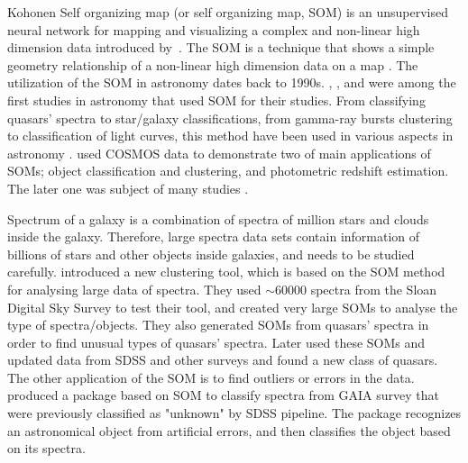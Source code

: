 \documentclass[useAMS,usenatbib]{mn2e}
\begin{document}
Kohonen Self organizing map (or self organizing map, SOM) is an unsupervised neural network for mapping and visualizing a complex and non-linear high dimension data introduced by~\citep{Kohonen82}.
The SOM is a technique that shows a simple geometry relationship of a non-linear high dimension data on a map \citep{Kohonen98}.
The utilization of the SOM in astronomy dates back to 1990s. 
\citet[][]{Odewahn92}, \citet[][]{Hernandez94}, and \citet[][]{Murtagh95} were among the first studies in astronomy that used SOM for their studies.
From classifying quasars' spectra to star/galaxy classifications, from gamma-ray bursts clustering to classification of light curves, this method have been used in various aspects in astronomy \citep[e.g.][]{Maehoenen95, Miller96,Andreon00,Balastegui01,Rajaniemi02,Brett04,Scaringi09}.
\citet{Geach12} used COSMOS data to demonstrate two of main applications of SOMs; object classification and clustering, and photometric redshift estimation. 
The later one was subject of many studies \citep[e.g.][]{Kind14a}.

Spectrum of a galaxy is a combination of spectra of million stars and clouds inside the galaxy.
Therefore, large spectra data sets contain information of billions of stars and other objects inside galaxies, and needs to be studied carefully. %
\citet{In12} introduced a new clustering tool, which is based on the SOM method for analysing large data of spectra.
They used $\sim 60000$ spectra from the Sloan Digital Sky Survey \citep[SDSS;][]{Abazajian09}
to test their tool, and created very large SOMs to analyse the type of spectra/objects.
They also generated SOMs from quasars' spectra in order to find unusual types of quasars' spectra. Later \citet{Meusinger16} used these SOMs and updated data from SDSS and other surveys and found a new class of quasars.
The other application of the SOM is to find outliers or errors in the data.
\citet{Fustes13} produced a package based on SOM to classify spectra from GAIA survey that were previously classified as "unknown" by SDSS pipeline. The package recognizes an astronomical object from artificial errors, and then classifies the object based on its spectra.
\end{document}

